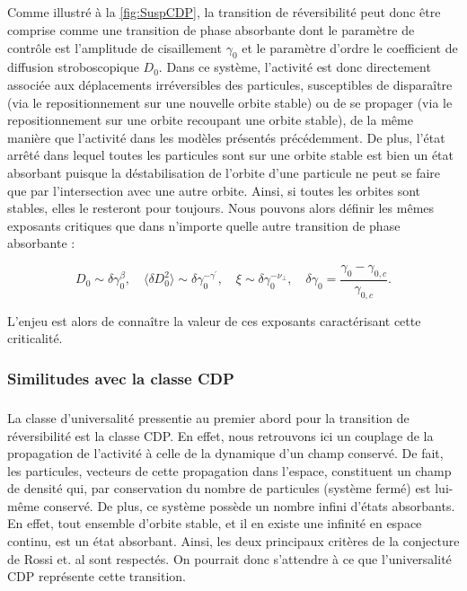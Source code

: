 \subparagraph{}Comme illustré à la \autoref{fig:SuspCDP}, la transition de réversibilité peut donc être comprise comme une transition de phase absorbante dont le paramètre de contrôle est l'amplitude de cisaillement $\gamma_0$ et le paramètre d'ordre le coefficient de diffusion stroboscopique $D_0$. Dans ce système, l'activité est donc directement associée aux déplacements irréversibles des particules, susceptibles de disparaître (via le repositionnement sur une nouvelle orbite stable) ou de se propager (via le repositionnement sur une orbite recoupant une orbite stable), de la même manière que l'activité dans les modèles présentés précédemment. De plus, l'état arrêté dans lequel toutes les particules sont sur une orbite stable est bien un état absorbant puisque la déstabilisation de l'orbite d'une particule ne peut se faire que par l'intersection avec une autre orbite. Ainsi, si toutes les orbites sont stables, elles le resteront pour toujours. Nous pouvons alors définir les mêmes exposants critiques que dans n'importe quelle autre transition de phase absorbante :

\begin{equation}
	D_0 \sim \delta\gamma_0^\beta, \quad \langle \delta D_0^2 \rangle \sim \delta\gamma_0^{-\gamma^\prime},\quad \xi \sim \delta\gamma_0^{-\nu_\perp}, \quad \delta\gamma_0 = \frac{\gamma_0-\gamma_{0,c}}{\gamma_{0,c}}.
\end{equation}

\noindent L'enjeu est alors de connaître la valeur de ces exposants caractérisant cette criticalité.

\subsubsection{Similitudes avec la classe CDP}

\subparagraph{}La classe d'universalité pressentie au premier abord pour la transition de réversibilité est la classe CDP. En effet, nous retrouvons ici un couplage de la propagation de l'activité à celle de la dynamique d'un champ conservé. De fait, les particules, vecteurs de cette propagation dans l'espace, constituent un champ de densité qui, par conservation du nombre de particules (système fermé) est lui-même conservé. De plus, ce système possède un nombre infini d'états absorbants. En effet, tout ensemble d'orbite stable, et il en existe une infinité en espace continu, est un état absorbant. Ainsi, les deux principaux critères de la conjecture de Rossi et. al \cite{rossi_universality_2000} sont respectés. On pourrait donc s'attendre à ce que l'universalité CDP représente cette transition.

